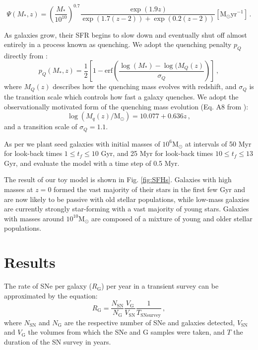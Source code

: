 \documentclass[fleqn,usenatbib]{mnras}
\begin{document}
\begin{equation}
    \Psi(M_*,z) = \left(\frac{M_*}{10^{10}}\right)^{0.7}\frac{\exp{\left(1.9z\right)}}{\exp{\left(1.7\left(z-2\right)\right)} + \exp{\left(0.2\left(z-2\right)\right)} } [\mathrm{M}_{\odot} \mathrm{yr}^{-1}]\,.
\end{equation}

As galaxies grow, their SFR begins to slow down and eventually shut off almost entirely in a process known as quenching. We adopt the quenching penalty $p_Q$ directly from \citet{Childress2014}:
\begin{equation}
    p_Q(M_*,z) = \frac{1}{2}\left[1 - \mathrm{erf}\left(\frac{\log(M_*) - \log(M_Q(z)}{\sigma_Q}\right)\right]\,,
\end{equation}
where $M_Q(z)$ describes how the quenching mass evolves with redshift, and $\sigma_Q$ is the transition scale which controls how fast a galaxy quenches. We adopt the observationally motivated form of the quenching mass evolution (Eq. A8 from \citealt{Childress2014}):
\begin{equation}
    \log(M_q(z)/\mathrm{M}_{\odot}) = 10.077 + 0.636z \,, 
\end{equation}
and a transition scale of $\sigma_Q = 1.1$. 

As per \citet{Childress2014} we plant seed galaxies with initial masses of $10^6 \mathrm{M}_{\odot}$ at intervals of 50 Myr for look-back times $1 \leq t_f \leq 10$ Gyr, and 25 Myr for look-back times $10 \leq t_f \leq 13$ Gyr, and evaluate the model with a time step of 0.5 Myr.

The result of our toy model is shown in Fig. \ref{fig:SFHs}. Galaxies with high masses at $z=0$ formed the vast majority of their stars in the first few Gyr and are now likely to be passive with old stellar populations, while low-mass galaxies are currently strongly star-forming with a vast majority of young stars. Galaxies with masses around $10^{10} \mathrm{M}_{\odot}$ are composed of a mixture of young and older stellar populations.


\section{Results}
\label{sec:rates}
The rate of SNe per galaxy ($R_{\mathrm{G}}$) per year in a transient survey can be approximated by the equation:
\begin{equation}
    R_{\mathrm{G}} = \frac{N_{\mathrm{SN}}}{N_{\mathrm{G}}} \frac{V_{\mathrm{G}}}{V_{\mathrm{SN}}}\frac{1}{T_{\mathrm{SN  survey}}}\,,
\label{eq:rate1}
\end{equation}
where $N_{\mathrm{SN}}$ and $N_{\mathrm{G}}$ are the respective number of SNe and galaxies detected, $V_{\mathrm{SN}}$ and $V_{\mathrm{G}}$ the volumes from which the SNe and G samples were taken, and $T$ the duration of the SN survey in years. 
\end{document}

